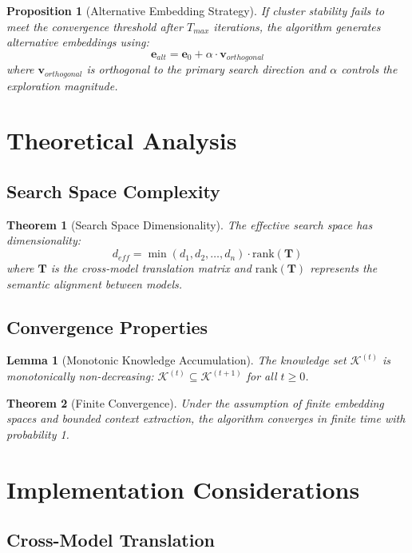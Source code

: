 \documentclass{article}
\newtheorem{theorem}{Theorem}
\newtheorem{lemma}{Lemma}
\newtheorem{proposition}{Proposition}
\begin{document}
\begin{proposition}[Alternative Embedding Strategy]
If cluster stability fails to meet the convergence threshold after $T_{max}$ iterations, the algorithm generates alternative embeddings using:
$$\mathbf{e}_{alt} = \mathbf{e}_0 + \alpha \cdot \mathbf{v}_{orthogonal}$$
where $\mathbf{v}_{orthogonal}$ is orthogonal to the primary search direction and $\alpha$ controls the exploration magnitude.
\end{proposition}

\section{Theoretical Analysis}

\subsection{Search Space Complexity}

\begin{theorem}[Search Space Dimensionality]
The effective search space has dimensionality:
$$d_{eff} = \min(d_1, d_2, \ldots, d_n) \cdot \text{rank}(\mathbf{T})$$
where $\mathbf{T}$ is the cross-model translation matrix and $\text{rank}(\mathbf{T})$ represents the semantic alignment between models.
\end{theorem}

\subsection{Convergence Properties}

\begin{lemma}[Monotonic Knowledge Accumulation]
The knowledge set $\mathcal{K}^{(t)}$ is monotonically non-decreasing: $\mathcal{K}^{(t)} \subseteq \mathcal{K}^{(t+1)}$ for all $t \geq 0$.
\end{lemma}

\begin{theorem}[Finite Convergence]
Under the assumption of finite embedding spaces and bounded context extraction, the algorithm converges in finite time with probability 1.
\end{theorem}

\section{Implementation Considerations}

\subsection{Cross-Model Translation}
\end{document}
